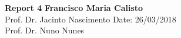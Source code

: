 \documentclass[a4paper, 11pt]{article}
\begin{document}
\noindent
\large\textbf{Report 4} \hfill \textbf{Francisco Maria Calisto} \\
\normalsize
Prof. Dr. Jacinto Nascimento \hfill Date: 26/03/2018 \\
Prof. Dr. Nuno Nunes





\clearpage



\end{document}

